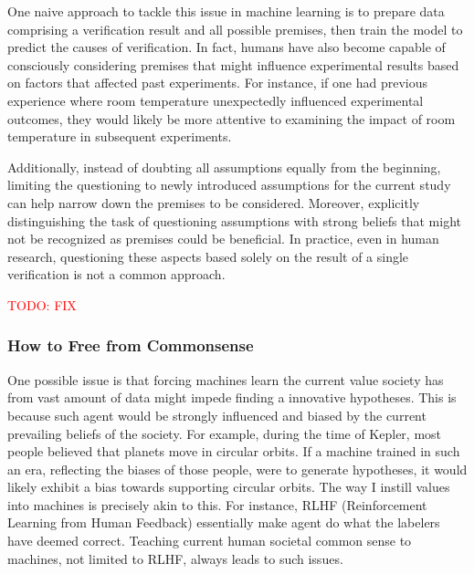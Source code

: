 One naive approach to tackle this issue in machine learning is to prepare data comprising a verification result and all possible premises, then train the model to predict the causes of verification. In fact, humans have also become capable of consciously considering premises that might influence experimental results based on factors that affected past experiments. For instance, if one had previous experience where room temperature unexpectedly influenced experimental outcomes, they would likely be more attentive to examining the impact of room temperature in subsequent experiments.

Additionally, instead of doubting all assumptions equally from the beginning, limiting the questioning to newly introduced assumptions for the current study can help narrow down the premises to be considered. Moreover, explicitly distinguishing the task of questioning assumptions with strong beliefs that might not be recognized as premises could be beneficial. In practice, even in human research, questioning these aspects based solely on the result of a single verification is not a common approach.

\textcolor{red}{TODO: FIX}

\subsubsection{How to Free from Commonsense}

One possible issue is that forcing machines learn the current value society has from vast amount of data might impede finding a innovative hypotheses. This is because such agent would be strongly influenced and biased by the current prevailing beliefs of the society. For example, during the time of Kepler, most people believed that planets move in circular orbits. If a machine trained in such an era, reflecting the biases of those people, were to generate hypotheses, it would likely exhibit a bias towards supporting circular orbits. The way I instill values into machines is precisely akin to this. For instance, RLHF (Reinforcement Learning from Human Feedback) essentially make agent do what the labelers have deemed correct. Teaching current human societal common sense to machines, not limited to RLHF, always leads to such issues.
 

